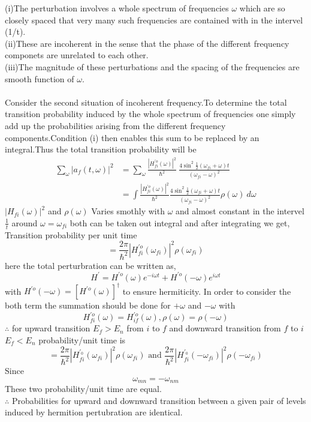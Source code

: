 (i)The perturbation involves a whole spectrum of frequencies $\omega$ which are so closely spaced that very many such frequencies are contained with in the intervel (1/t).\\
(ii)These are incoherent in the sense that the phase of the different frequency componets are unrelated to each other.\\
(iii)The magnitude of these perturbations and the spacing of the frequencies are smooth function of $\omega$.\\\\
Consider the second situation of incoherent frequency.To determine the total transition probability induced by the whole spectrum of frequencies one simply add up the probabilities arising from the different frequency components.Condition (i) then enables this sum to be replaced by an integral.Thus the total transition probability will be 
$$
\begin{aligned}
\sum_{\omega} |a_f(t,\omega)|^2 &= \sum_{\omega}  \frac{|H^{\prime o}_{fi}(\omega)|^2}{\hbar^2}\ \frac{4 \sin^2\frac{1}{2}(\omega_{fi}+\omega)t}{(\omega_{fi}-\omega)^2}\\
&=\int \frac{|H^{\prime o}_{fi}(\omega)|^2}{\hbar^2}\frac{4 \sin^2\frac{1}{2}(\omega_{fi}+\omega)t}{(\omega_{fi}-\omega)^2}\rho (\omega)\ d\omega
\end{aligned}
$$
$|H_{fi}(\omega)|^2$ and $\rho(\omega)$ Varies smothly with $\omega$ and almost constant in the intervel $\frac{1}{t}$ around $\omega=\omega_{fi}$ both can be taken out integral and after integrating we get,\\
Transition probability per unit time
$$  = \frac{2\pi}{\hbar^2}|H^{\prime o}_{fi}(\omega_{fi})|^2 \rho (\omega_{fi})$$
here the total perturbration can be written as,
$$H^\prime = H^{\prime o}(\omega)e^{-i\omega t}+ H^{\prime o}(-\omega)e^{i\omega t}$$
with $H^{\prime o}(-\omega)=[H^{\prime o}(\omega)]^\dagger$ to ensure hermiticity.
In order to consider the both term the summation should be done for $+\omega$ and $-\omega$ with
$$ H^{\prime o}_{fi}(\omega)=H^{\prime o}_{if}(\omega),\rho(\omega)=\rho(-\omega)$$
$\therefore$ for upward transition $E_f>E_n$ from $i$ to $f$ and downward transition from $f$ to $i$ $E_f<E_n$
probability/unit time is 
$$ =\frac{2\pi}{\hbar^2}|H^{\prime_0}_{fi}(\omega_{fi})|^2 \rho(\omega_{fi})\text{ and } \frac{2\pi}{\hbar^2}|H^{\prime_0}_{fi}(-\omega_{fi})|^2\rho(-\omega_{fi})$$
Since $$\omega_{mn}=-\omega_{nm}$$
These two probability/unit time are equal.\\
$\therefore$ Probabilities for upward and downward transition between a given pair of levels induced by hermition pertubration are identical.







